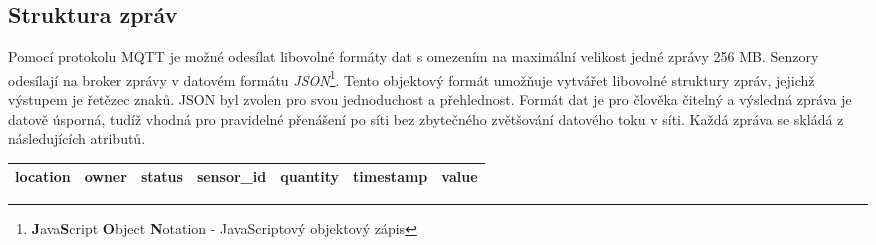 \subsection{Struktura zpráv} \label{subsec:message_structure}
Pomocí protokolu MQTT je možné odesílat libovolné formáty dat s omezením na maximální velikost jedné zprávy 256 MB. Senzory odesílají na broker zprávy v datovém formátu \textit{JSON}\footnote{\textbf{J}ava\textbf{S}cript \textbf{O}bject \textbf{N}otation - JavaScriptový objektový zápis}. Tento objektový formát umožňuje vytvářet libovolné struktury zpráv, jejichž výstupem je řetězec znaků. JSON byl zvolen pro svou jednoduchost a přehlednost. Formát dat je pro člověka čitelný a výsledná zpráva je datově úsporná, tudíž vhodná pro pravidelné přenášení po síti bez zbytečného zvětšování datového toku v síti. Každá zpráva se skládá z následujících atributů.

\begin{table}[h!]
\centering
\begin{tabular}{|c|c|c|c|c|c|c|} 
 \hline
 location & owner & status & sensor\_id & quantity & timestamp & value \\
 \hline
\end{tabular}
\end{table}


